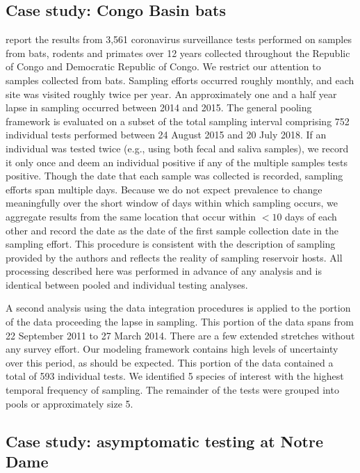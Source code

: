 \documentclass{article}
\begin{document}
\subsection{Case study: Congo Basin bats}
\cite{kumakamba2021coronavirus} report the results from 3,561 coronavirus surveillance tests performed on samples from bats, rodents and primates over 12 years collected throughout the Republic of Congo and Democratic Republic of Congo. We restrict our attention to samples collected from bats. Sampling efforts occurred roughly monthly, and each site was visited roughly twice per year. An approximately one and a half year lapse in sampling occurred between 2014 and 2015. The general pooling framework is evaluated on a subset of the total sampling interval comprising 752 individual tests performed between 24 August 2015 and 20 July 2018. If an individual was tested twice (e.g., using both fecal and saliva samples), we record it only once and deem an individual positive if any of the multiple samples tests positive. Though the date that each sample was collected is recorded, sampling efforts span multiple days. Because we do not expect prevalence to change meaningfully over the short window of days within which sampling occurs, we aggregate results from the same location that occur within $<10$ days of each other and record the date as the date of the first sample collection date in the sampling effort. This procedure is consistent with the description of sampling provided by the authors and reflects the reality of sampling reservoir hosts. All processing described here was performed in advance of any analysis and is identical between pooled and individual testing analyses.

A second analysis using the data integration procedures is applied to the portion of the data proceeding the lapse in sampling. This portion of the data spans from 22 September 2011 to 27 March 2014. There are a few extended stretches without any survey effort. Our modeling framework contains high levels of uncertainty over this period, as should be expected. This portion of the data contained a total of 593 individual tests. We identified 5 species of interest with the highest temporal frequency of sampling. The remainder of the tests were grouped into pools or approximately size 5. 

\subsection{Case study: asymptomatic testing at Notre Dame}
\end{document}
